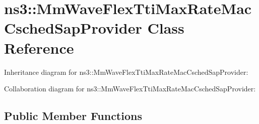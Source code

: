 \hypertarget{classns3_1_1MmWaveFlexTtiMaxRateMacCschedSapProvider}{}\section{ns3\+:\+:Mm\+Wave\+Flex\+Tti\+Max\+Rate\+Mac\+Csched\+Sap\+Provider Class Reference}
\label{classns3_1_1MmWaveFlexTtiMaxRateMacCschedSapProvider}


Inheritance diagram for ns3\+:\+:Mm\+Wave\+Flex\+Tti\+Max\+Rate\+Mac\+Csched\+Sap\+Provider\+:


Collaboration diagram for ns3\+:\+:Mm\+Wave\+Flex\+Tti\+Max\+Rate\+Mac\+Csched\+Sap\+Provider\+:
\subsection*{Public Member Functions}
